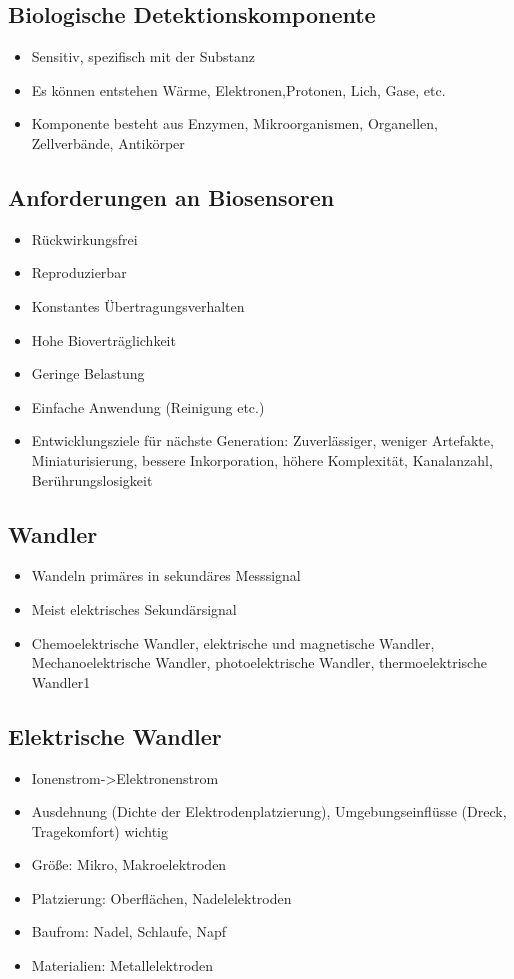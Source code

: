 \documentclass[a4paper,10pt,oneside]{article}
\begin{document}
\subsection{Biologische Detektionskomponente}
\begin{itemize}
	\item Sensitiv, spezifisch mit der Substanz
	\item Es können entstehen Wärme, Elektronen,Protonen, Lich, Gase, etc.
	\item Komponente besteht aus Enzymen, Mikroorganismen, Organellen, Zellverbände, Antikörper
\end{itemize}

\subsection{Anforderungen an Biosensoren}
\begin{itemize}
	\item Rückwirkungsfrei
	\item Reproduzierbar
	\item Konstantes Übertragungsverhalten
	\item Hohe Bioverträglichkeit
	\item Geringe Belastung
	\item Einfache Anwendung (Reinigung etc.)
	\item Entwicklungsziele für nächste Generation: Zuverlässiger, weniger Artefakte, Miniaturisierung, bessere Inkorporation, höhere Komplexität, Kanalanzahl, Berührungslosigkeit
\end{itemize}

\subsection{Wandler}
\begin{itemize}
	\item Wandeln primäres in sekundäres Messsignal
	\item Meist elektrisches Sekundärsignal
	\item Chemoelektrische Wandler, elektrische und magnetische Wandler, Mechanoelektrische Wandler, photoelektrische Wandler, thermoelektrische Wandler1
\end{itemize}

\subsection{Elektrische Wandler}
\begin{itemize}
	\item Ionenstrom->Elektronenstrom
	\item Ausdehnung (Dichte der Elektrodenplatzierung), Umgebungseinflüsse (Dreck, Tragekomfort) wichtig
	\item Größe: Mikro, Makroelektroden
	\item Platzierung: Oberflächen, Nadelelektroden
	\item Baufrom: Nadel, Schlaufe, Napf
	\item Materialien: Metallelektroden
\end{itemize}
\end{document}
